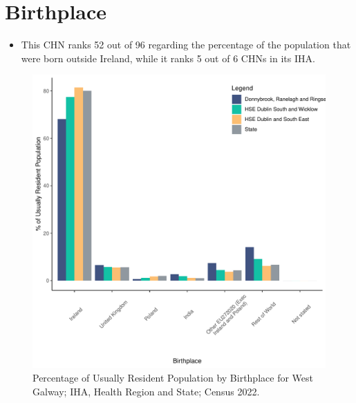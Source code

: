 \documentclass{article}
\begin{document}
\section{Birthplace}\label{sect:Birth}
\begin{itemize}
\item This CHN ranks  52 out of 96 regarding the percentage of the population that were born outside Ireland, while it ranks  5 out of 6 CHNs in its IHA.
\end{itemize}
\begin{figure}[H]
	\centering
	\includegraphics[width = 130mm]{../figures/BirthED.pdf}
	\caption{Percentage of Usually Resident Population by Birthplace for West Galway; IHA, Health Region and State; Census 2022.}
	\label{fig:vbnv}
	\end{figure}
	
\end{document}
